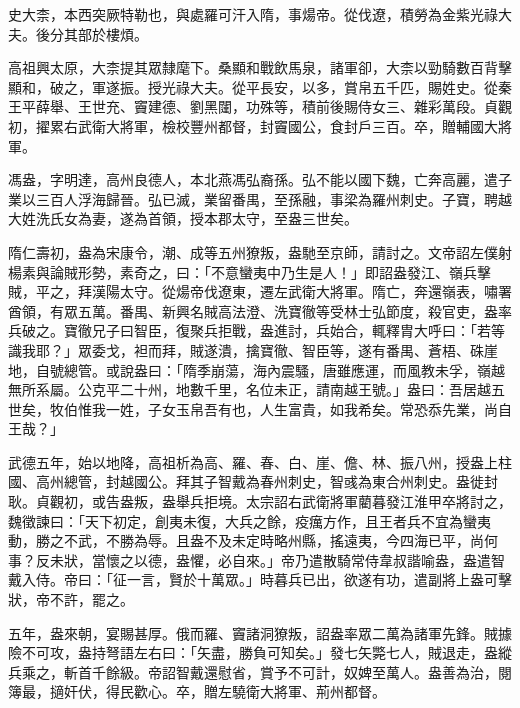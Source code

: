 
\begin{pinyinscope}

 史大柰，本西突厥特勒也，與處羅可汗入隋，事煬帝。從伐遼，積勞為金紫光祿大夫。後分其部於樓煩。



 高祖興太原，大柰提其眾隸麾下。桑顯和戰飲馬泉，諸軍卻，大柰以勁騎數百背擊顯和，破之，軍遂振。授光祿大夫。從平長安，以多，賞帛五千匹，賜姓史。從秦王平薛舉、王世充、竇建德、劉黑闥，功殊等，積前後賜侍女三、雜彩萬段。貞觀初，擢累右武衛大將軍，檢校豐州都督，封竇國公，食封戶三百。卒，贈輔國大將軍。



 馮盎，字明達，高州良德人，本北燕馮弘裔孫。弘不能以國下魏，亡奔高麗，遣子業以三百人浮海歸晉。弘已滅，業留番禺，至孫融，事梁為羅州刺史。子寶，聘越大姓洗氏女為妻，遂為首領，授本郡太守，至盎三世矣。



 隋仁壽初，盎為宋康令，潮、成等五州獠叛，盎馳至京師，請討之。文帝詔左僕射楊素與論賊形勢，素奇之，曰：「不意蠻夷中乃生是人！」即詔盎發江、嶺兵擊賊，平之，拜漢陽太守。從煬帝伐遼東，遷左武衛大將軍。隋亡，奔還嶺表，嘯署酋領，有眾五萬。番禺、新興名賊高法澄、洗寶徹等受林士弘節度，殺官吏，盎率兵破之。寶徹兄子曰智臣，復聚兵拒戰，盎進討，兵始合，輒釋胄大呼曰：「若等識我耶？」眾委戈，袒而拜，賊遂潰，擒寶徹、智臣等，遂有番禺、蒼梧、硃崖地，自號總管。或說盎曰：「隋季崩蕩，海內震騷，唐雖應運，而風教未孚，嶺越無所系屬。公克平二十州，地數千里，名位未正，請南越王號。」盎曰：吾居越五世矣，牧伯惟我一姓，子女玉帛吾有也，人生富貴，如我希矣。常恐忝先業，尚自王哉？」



 武德五年，始以地降，高祖析為高、羅、春、白、崖、儋、林、振八州，授盎上柱國、高州總管，封越國公。拜其子智戴為春州刺史，智彧為東合州刺史。盎徙封耿。貞觀初，或告盎叛，盎舉兵拒境。太宗詔右武衛將軍藺暮發江淮甲卒將討之，魏徵諫曰：「天下初定，創夷未復，大兵之餘，疫癘方作，且王者兵不宜為蠻夷動，勝之不武，不勝為辱。且盎不及未定時略州縣，搖遠夷，今四海已平，尚何事？反未狀，當懷之以德，盎懼，必自來。」帝乃遣散騎常侍韋叔諧喻盎，盎遣智戴入侍。帝曰：「征一言，賢於十萬眾。」時暮兵已出，欲遂有功，遣副將上盎可擊狀，帝不許，罷之。



 五年，盎來朝，宴賜甚厚。俄而羅、竇諸洞獠叛，詔盎率眾二萬為諸軍先鋒。賊據險不可攻，盎持弩語左右曰：「矢盡，勝負可知矣。」發七矢斃七人，賊退走，盎縱兵乘之，斬首千餘級。帝詔智戴還慰省，賞予不可計，奴婢至萬人。盎善為治，閱簿最，擿奸伏，得民歡心。卒，贈左驍衛大將軍、荊州都督。




\end{pinyinscope}
